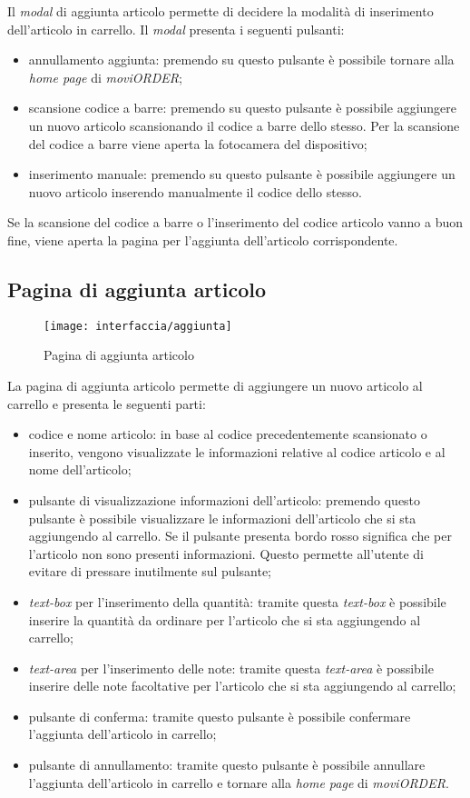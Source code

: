 Il \textit{modal} di aggiunta articolo permette di decidere la modalità di inserimento dell'articolo in carrello. Il \textit{modal} presenta i seguenti pulsanti:
\begin{itemize}
	\item annullamento aggiunta: premendo su questo pulsante è possibile tornare alla \textit{home page} di \textit{moviORDER};
	\item scansione codice a barre: premendo su questo pulsante è possibile aggiungere un nuovo articolo scansionando il codice a barre dello stesso. Per la scansione del codice a barre viene aperta la fotocamera del dispositivo;
	\item inserimento manuale: premendo su questo pulsante è possibile aggiungere un nuovo articolo inserendo manualmente il codice dello stesso.
\end{itemize}
Se la scansione del codice a barre o l'inserimento del codice articolo vanno a buon fine, viene aperta la pagina per l'aggiunta dell'articolo corrispondente.

\subsection{Pagina di aggiunta articolo}

\begin{figure}[!h] 
    \centering 
    \texttt{[image: interfaccia/aggiunta]} 
    \caption{Pagina di aggiunta articolo}
\end{figure}

La pagina di aggiunta articolo permette di aggiungere un nuovo articolo al carrello e presenta le seguenti parti:
\begin{itemize}
	\item codice e nome articolo: in base al codice precedentemente scansionato o inserito, vengono visualizzate le informazioni relative al codice articolo e al nome dell'articolo;
	\item pulsante di visualizzazione informazioni dell'articolo: premendo questo pulsante è possibile visualizzare le informazioni dell'articolo che si sta aggiungendo al carrello. Se il pulsante presenta bordo rosso significa che per l'articolo non sono presenti informazioni. Questo permette all'utente di evitare di pressare inutilmente sul pulsante;
	\item \textit{text-box} per l'inserimento della quantità: tramite questa \textit{text-box} è possibile inserire la quantità da ordinare per l'articolo che si sta aggiungendo al carrello;
	\item \textit{text-area} per l'inserimento delle note: tramite questa \textit{text-area} è possibile inserire delle note facoltative per l'articolo che si sta aggiungendo al carrello;
	\item pulsante di conferma: tramite questo pulsante è possibile confermare l'aggiunta dell'articolo in carrello;
	\item pulsante di annullamento: tramite questo pulsante è possibile annullare l'aggiunta dell'articolo in carrello e tornare alla \textit{home page} di \textit{moviORDER}.
\end{itemize}

